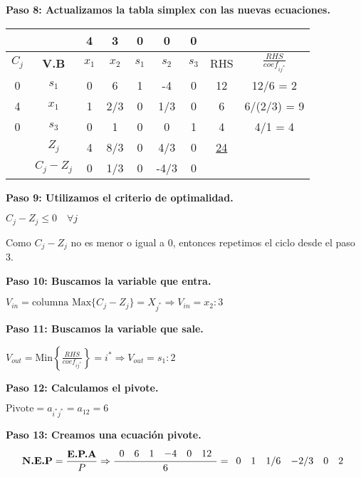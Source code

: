\documentclass{templateNote}
\begin{document}
\textbf{Paso 8: Actualizamos la tabla simplex con las nuevas ecuaciones.}
\begin{center}
    \begin{tabular}{|c|c|c|c|c|c|c|c|c|}
        \hline
        & & 4 & 3 & 0 & 0 & 0 &  &  \\ \hline
        $C_j$ & \textbf{V.B} & $x_1$ & $x_2$ & $s_1$ & $s_2$ & $s_3$ & RHS & $\displaystyle\frac{RHS}{coef_{ij^*}}$ \\ \hline
        0 & $s_1$ & 0 & 6 & 1 & -4 & 0 & 12 & 12/6 = 2\\ \hline
        4 & $x_1$ & 1 & 2/3 & 0 & 1/3 & 0 & 6 & 6/(2/3) = 9\\ \hline
        0 & $s_3$ & 0 & 1 & 0 & 0 & 1 & 4 & 4/1 = 4\\ \hline
        & $Z_j$ & 4 & 8/3 & 0 & 4/3 & 0 & \underline{24} &  \\ \hline
        & $C_j - Z_j$ & 0 & 1/3 & 0 & -4/3 & 0 &  &  \\ \hline
    \end{tabular}
\end{center}

\textbf{Paso 9: Utilizamos el criterio de optimalidad.}
\begin{center}
    $C_j - Z_j \leq 0 \quad \forall j$
\end{center}

Como $C_j - Z_j$ no es menor o igual a 0, entonces repetimos el ciclo desde el paso 3.

\textbf{Paso 10: Buscamos la variable que entra.}
\begin{center}
    $V_{in} = \text{columna Max} \{C_j-Z_j\} = X_{j^*} \Rightarrow V_{in} = x_2 : 3$
\end{center}

\textbf{Paso 11: Buscamos la variable que sale.}
\begin{center}
    $V_{out} = \text{Min} \left\{ \frac{RHS}{coef_{ij^*}} \right\} = i^* \Rightarrow V_{out} = s_1 : 2$
\end{center}

\textbf{Paso 12: Calculamos el pivote.}
\begin{center}
    $\text{Pivote} = a_{i^*j^*} = a_{12} = 6$
\end{center}

\textbf{Paso 13: Creamos una ecuación pivote.}
\begin{equation*}
    \textbf{N.E.P} = \frac{\textbf{E.P.A}}{P} \\
    \Rightarrow \frac{\begin{array}{cccccc} 0 & 6 & 1 & -4 & 0 & 12 \end{array}}{6} = \begin{array}{cccccc} 0 & 1 & 1/6 & -2/3 & 0 & 2 \end{array}
\end{equation*}
\end{document}
